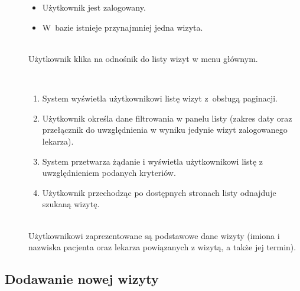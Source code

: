 \documentclass[11pt]{aghdpl}
\begin{document}
	\begin{description}
		\item[\useCaseAktor] \hfill \\
			\useCaseUzytkownik
		\item[\useCaseWarPocz] \hfill \\
		\begin{itemize}
			\item Użytkownik jest zalogowany.
			\item W~bazie istnieje przynajmniej jedna wizyta.
		\end{itemize}
			
		\item[\useCaseZdarzInicj] \hfill \\
			Użytkownik klika na odnośnik do listy wizyt w menu głównym.
		\item[\useCaseScenBaz] \hfill \\ 
			\begin{enumerate}
			\item System wyświetla użytkownikowi listę wizyt z~obsługą paginacji.
			\item Użytkownik określa dane filtrowania w panelu listy (zakres daty oraz przełącznik do uwzględnienia w wyniku jedynie wizyt zalogowanego lekarza).
			\item System przetwarza żądanie i wyświetla użytkownikowi listę z uwzględnieniem podanych kryteriów.
			\item Użytkownik przechodząc po dostępnych stronach listy odnajduje szukaną wizytę.
			\end{enumerate}
		\item[\useCaseWarKonc] \hfill \\ 
			Użytkownikowi zaprezentowane są podstawowe dane wizyty (imiona i nazwiska pacjenta oraz lekarza powiązanych z wizytą, a także jej termin).
	\end{description}

\subsection{Dodawanie nowej wizyty}
\end{document}
